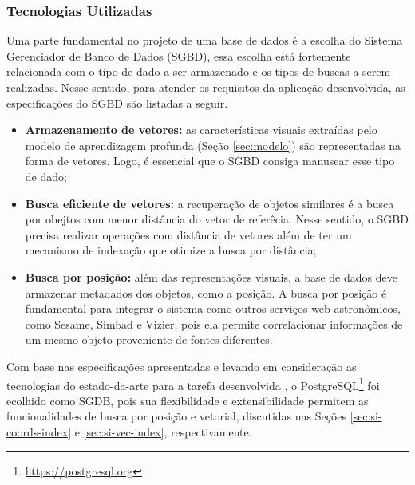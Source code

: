 


\subsubsection{Tecnologias Utilizadas}
\label{sec:si-tecnologias}

Uma parte fundamental no projeto de uma base de dados é a escolha do Sistema Gerenciador de Banco de Dados (SGBD), essa escolha está fortemente relacionada com o tipo de dado a ser armazenado e os tipos de buscas a serem realizadas. Nesse sentido, para atender os requisitos da aplicação desenvolvida, as especificações do SGBD são listadas a seguir.

\begin{itemize}
  \item \textbf{Armazenamento de vetores:} as características visuais extraídas pelo modelo de aprendizagem profunda (Seção \ref{sec:modelo}) são representadas na forma de vetores. Logo, é essencial que o SGBD  consiga manusear esse tipo de dado;
  \item \textbf{Busca eficiente de vetores:} a recuperação de objetos similares é a busca por obejtos com menor distância do vetor de referêcia. Nesse sentido, o SGBD precisa realizar operações com distância de vetores além de ter um mecanismo de indexação que otimize a busca por distância;
  \item \textbf{Busca por posição:} além das representações visuais, a base de dados deve armazenar metadados dos objetos, como a posição. A busca por posição é fundamental para integrar o sistema como outros serviços web astronômicos, como Sesame, Simbad e Vizier, pois ela permite correlacionar informações de um mesmo objeto proveniente de fontes diferentes.
\end{itemize}

Com base nas especificações apresentadas e levando em consideração as tecnologias do estado-da-arte para a tarefa desenvolvida \citep{pan2024}, o PostgreSQL\footnote{\url{https://postgresql.org}} foi ecolhido como SGDB, pois sua flexibilidade e extensibilidade permitem as funcionalidades de busca por posição e vetorial, discutidas nas Seções \ref{sec:si-coords-index} e \ref{sec:si-vec-index}, respectivamente.


